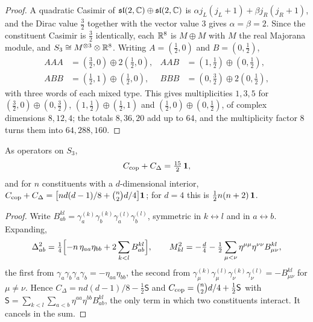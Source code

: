 \begin{proof}
A quadratic Casimir of $\mathfrak{sl}(2,\mathbb{C})\oplus\mathfrak{sl}(2,\mathbb{C})$ is $\alpha j_L(j_L+1)+\beta j_R(j_R+1)$, and the Dirac value $\tfrac32$ together with the
vector value $3$ gives $\alpha=\beta=2$. Since the constituent Casimir is $\tfrac32$ identically, each $\mathbb{R}^8$ is $M\oplus M$ with $M$ the
real Majorana module, and $S_3\cong M^{\otimes3}\otimes\mathbb{R}^8$. Writing $A=(\tfrac12,0)$ and $B=(0,\tfrac12)$,
\[
\begin{aligned}
AAA&=(\tfrac32,0)\oplus2(\tfrac12,0), & AAB&=(1,\tfrac12)\oplus(0,\tfrac12),\\
ABB&=(\tfrac12,1)\oplus(\tfrac12,0), & BBB&=(0,\tfrac32)\oplus2(0,\tfrac12),
\end{aligned}
\]
with three words of each mixed type. This gives multiplicities $1,3,5$ for $(\tfrac32,0)\oplus(0,\tfrac32)$, $(1,\tfrac12)\oplus(\tfrac12,1)$ and
$(\tfrac12,0)\oplus(0,\tfrac12)$, of complex dimensions $8,12,4$; the totals $8,36,20$ add up to $64$, and the multiplicity factor $8$ turns them
into $64,288,160$.
\end{proof}

\begin{theorem}
\label{thm:casid}
As operators on $S_3$,
\begin{equation}
\label{eq:casid}
C_{\rm cop}+C_\Delta=\tfrac{15}2\,\mathbf 1 ,
\end{equation}
and for $n$ constituents with a $d$-dimensional interior, $C_{\rm cop}+C_\Delta=\bigl[nd(d-1)/8+\binom n2d/4\bigr]\mathbf 1$; for $d=4$ this is
$\tfrac12n(n+2)\,\mathbf 1$.
\end{theorem}

\begin{proof}
Write $B^{kl}_{ab}=\gamma^{(k)}_a\gamma^{(k)}_b\gamma^{(l)}_a\gamma^{(l)}_b$, symmetric in $k\leftrightarrow l$ and in $a\leftrightarrow b$. Expanding,
\[
\Delta_{ab}^2=\tfrac14\Bigl[-n\,\eta_{aa}\eta_{bb}+2\sum_{k<l}B^{kl}_{ab}\Bigr],\qquad
M_{kl}^2=-\tfrac d4-\tfrac12\sum_{\mu<\nu}\eta^{\mu\mu}\eta^{\nu\nu}B^{kl}_{\mu\nu},
\]
the first from $\gamma_a\gamma_b\gamma_a\gamma_b=-\eta_{aa}\eta_{bb}$, the second from
$\gamma^{(k)}_\mu\gamma^{(l)}_\mu\gamma^{(k)}_\nu\gamma^{(l)}_\nu=-B^{kl}_{\mu\nu}$ for $\mu\neq\nu$. Hence $C_\Delta=nd(d-1)/8-\tfrac12\mathsf S$ and
$C_{\rm cop}=\binom n2d/4+\tfrac12\mathsf S$ with $\mathsf S=\sum_{k<l}\sum_{a<b}\eta^{aa}\eta^{bb}B^{kl}_{ab}$, the only term in which two
constituents interact. It cancels in the sum.
\end{proof}

